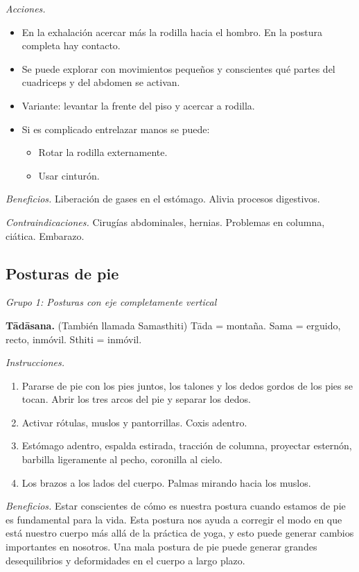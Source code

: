 \emph{Acciones.}
\begin{itemize}
\item En la exhalación acercar más la rodilla
hacia el hombro. En la postura completa hay
contacto.
\item Se puede explorar con movimientos
pequeños y conscientes qué partes del
cuadriceps y del abdomen se activan.
\item Variante: levantar la frente del piso y
acercar a rodilla.
\item Si es complicado entrelazar manos se
puede:
\begin{itemize}
\item Rotar la rodilla externamente.
\item Usar cinturón.
\end{itemize}
\end{itemize}

\emph{Beneficios.} Liberación de gases en el
estómago. Alivia procesos digestivos.

\emph{Contraindicaciones.} Cirugías
abdominales, hernias. Problemas en columna,
ciática. Embarazo.

\subsection{Posturas de pie}
\label{section-posturas-de-pie}

\medskip\noindent\emph{Grupo 1: Posturas con
eje completamente vertical}

\medskip\noindent\textbf{Tādāsana.}
(También llamada Samasthiti) Tāda = montaña.
Sama = erguido, recto, inmóvil. Sthiti =
inmóvil.

\emph{Instrucciones.}
\begin{enumerate}
\item Pararse de pie con los pies juntos, los
talones y los dedos gordos de los pies se
tocan. Abrir los tres arcos del pie y separar
los dedos.
\item Activar rótulas, muslos y pantorrillas.
Coxis adentro.
\item Estómago adentro, espalda estirada,
tracción de columna, proyectar esternón,
barbilla ligeramente al pecho, coronilla al
cielo.
\item Los brazos a los lados del cuerpo.
Palmas mirando hacia los muslos.
\end{enumerate}

\emph{Beneficios.} Estar conscientes de cómo
es nuestra postura cuando estamos de pie es
fundamental para la vida. Esta postura nos
ayuda a corregir el modo en que está nuestro
cuerpo más allá de la práctica de yoga, y
esto puede generar cambios importantes en
nosotros. Una mala postura de pie puede
generar grandes desequilibrios y deformidades
en el cuerpo a largo plazo.

